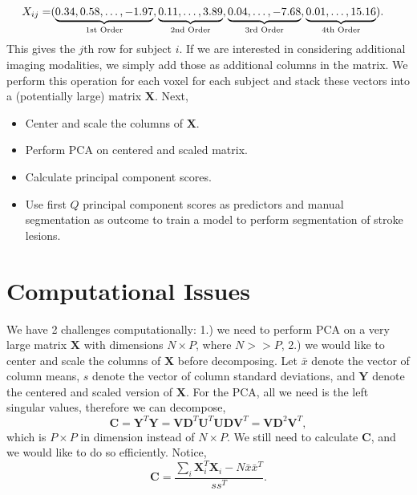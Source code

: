 \documentclass[a0,landscape]{a0poster}
\begin{document}
\begin{multicols}{3}
\begin{center}
\end{center}\vspace{.25cm}
\normalsize{
\begin{align*}
\begin{aligned}
X_{ij} = &(\underbrace{0.34, 0.58, \ldots, -1.97}_{\text{\normalfont 1st Order}}, \underbrace{0.11, \ldots, 3.89}_{\text{\normalfont 2nd Order}}, \underbrace{0.04, \ldots, -7.68}_{\text{\normalfont 3rd Order}}, \underbrace{0.01, \ldots, 15.16}_{\text{\normalfont 4th Order}}).
\end{aligned}
\end{align*}}
\large
\noindent This gives the $j$th row for subject $i$. If we are interested in considering additional imaging modalities, we simply add those as additional columns in the matrix. We perform this operation for each voxel for each subject and stack these vectors into a (potentially large) matrix $\mathbf{X}$. Next,

\begin{itemize}
\item  Center and scale the columns of $\mathbf{X}$.
\item Perform PCA on centered and scaled matrix.
\item Calculate principal component scores. 
\item Use first $Q$ principal component scores as predictors and manual segmentation as outcome to train a model to perform segmentation of stroke lesions.
\end{itemize}
\large{\section*{\color{uwred}Computational Issues}}
\noindent We have 2 challenges computationally: 1.) we need to perform PCA on a very large matrix $\mathbf{X}$ with dimensions $N \times P$, where $N>>P$, 2.) we would like to center and scale the columns of $\mathbf{X}$ before decomposing. Let $\bar{x}$ denote the vector of column means, $s$ denote the vector of column standard deviations, and $\mathbf{Y}$ denote the centered and scaled version of $\mathbf{X}$. For the PCA, all we need is the left singular values, therefore we can decompose,
\begin{equation*}
\mathbf{C} = \mathbf{Y}^T\mathbf{Y} = \mathbf{V}\mathbf{D}^T\mathbf{U}^T\mathbf{U}\mathbf{D}\mathbf{V}^T = \mathbf{V}\mathbf{D}^2\mathbf{V}^T,
\end{equation*}
which is $P \times P$ in dimension instead of $N \times P$. We still need to calculate $\mathbf{C}$, and we would like to do so efficiently. Notice,
\begin{equation} \label{eq:c}
\mathbf{C} = \frac{\sum_i\mathbf{X}_i^T\mathbf{X}_i-N\bar{x}\bar{x}^T}{ss^T}.
\end{equation}


\end{multicols}
\end{document}
